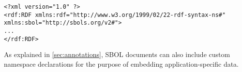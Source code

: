 
\begin{lstlisting}
<?xml version="1.0" ?>
<rdf:RDF xmlns:rdf="http://www.w3.org/1999/02/22-rdf-syntax-ns#" xmlns:sbol="http://sbols.org/v2#">
...
</rdf:RDF>
\end{lstlisting}

As explained in \ref{sec:annotations}, SBOL documents can also include custom namespace declarations for the purpose of embedding application-specific data.